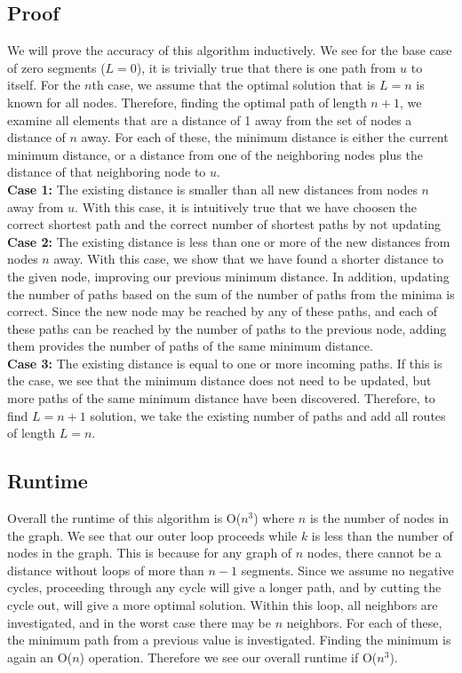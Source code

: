 \documentclass[titlepage]{article}
\begin{document}
\subsection{Proof}
We will prove the accuracy of this algorithm inductively. We see for the base case of zero segments ($L = 0$), it is trivially true that there
is one path from $u$ to itself. For the $n$th case, we assume that the optimal solution that is $L = n$ is known for all nodes. Therefore,
finding the optimal path of length $n + 1$, we examine all elements that are a distance of 1 away from the set of nodes a distance of $n$ away.
For each of these, the minimum distance is either the current minimum distance, or a distance from one of the neighboring nodes plus the distance
of that neighboring node to $u$. \\
\textbf{Case 1:} The existing distance is smaller than all new distances from nodes $n$ away from $u$. With this case, it is intuitively true
that we have choosen the correct shortest path and the correct number of shortest paths by not updating \\
\textbf{Case 2:} The existing distance is less than one or more of the new distances from nodes $n$ away. With this case, we show that we have
found a shorter distance to the given node, improving our previous minimum distance. In addition, updating the number of paths based on the sum
of the number of paths from the minima is correct. Since the new node may be reached by any of these paths, and each of these paths can be reached
by the number of paths to the previous node, adding them provides the number of paths of the same minimum distance.\\
\textbf{Case 3:} The existing distance is equal to one or more incoming paths. If this is the case, we see that the minimum distance does not
need to be updated, but more paths of the same minimum distance have been discovered. Therefore, to find $L = n+1$ solution, we take the existing
number of paths and add all routes of length $L = n$.
\subsection{Runtime}
Overall the runtime of this algorithm is O($n^3$) where $n$ is the number of nodes in the graph. We see that our outer loop proceeds while
$k$ is less than the number of nodes in the graph. This is because for any graph of $n$ nodes, there cannot be a distance without loops of
more than $n - 1$ segments. Since we assume no negative cycles, proceeding through any cycle will give a longer path, and by cutting the cycle
out, will give a more optimal solution. Within this loop, all neighbors are investigated, and in the worst case there may be $n$ neighbors.
For each of these, the minimum path from a previous value is investigated. Finding the minimum is again an O($n$) operation. Therefore we
see our overall runtime if O($n^3$).
\end{document}
